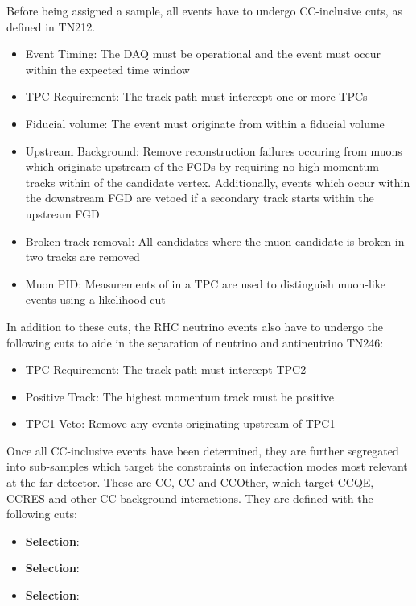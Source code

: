 Before being assigned a sample, all events have to undergo CC-inclusive cuts, as defined in TN212.

\begin{itemize}
\item Event Timing: The DAQ must be operational and the event must occur within the expected time window
\item TPC Requirement: The track path must intercept one or more TPCs
\item Fiducial volume: The event must originate from within a fiducial volume
\item Upstream Background: Remove reconstruction failures occuring from muons which originate upstream of the FGDs by requiring no high-momentum tracks within  of the candidate vertex. Additionally, events which occur within the downstream FGD are vetoed if a secondary track starts within the upstream FGD
\item Broken track removal: All candidates where the muon candidate is broken in two tracks are removed
\item Muon PID: Measurements of  in a TPC are used to distinguish muon-like events using a likelihood cut
\end{itemize}

In addition to these cuts, the RHC neutrino events also have to undergo the following cuts to aide in the separation of neutrino and antineutrino TN246:

\begin{itemize}
\item TPC Requirement: The track path must intercept TPC2
\item Positive Track: The highest momentum track must be positive
\item TPC1 Veto: Remove any events originating upstream of TPC1
\end{itemize}

Once all CC-inclusive events have been determined, they are further segregated into sub-samples which target the constraints on interaction modes most relevant at the far detector. These are CC\quickmath{0\pi}, CC\quickmath{1\pi} and CCOther, which target CCQE, CCRES and other CC background interactions. They are defined with the following cuts:

\begin{itemize}
\item \textbf{ Selection}:
\item \textbf{ Selection}:
\item \textbf{ Selection}: 
\end{itemize}

